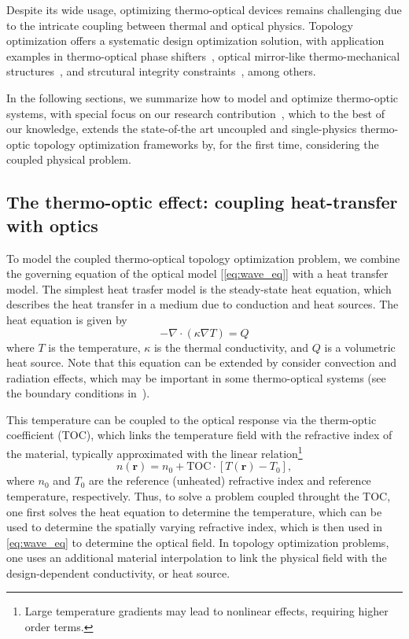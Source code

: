  Despite its wide usage, optimizing thermo-optical devices remains challenging due to the intricate coupling 
 between thermal and optical physics. Topology optimization offers a systematic design optimization solution, with application examples in
  thermo-optical phase shifters~\cite{TOPS_heat, ownpub0}, optical mirror-like thermo-mechanical structures~\cite{opt_perf}, and
strcutural integrity constraints~\cite{structural_heat}, among others.

In the following sections, we summarize how to model and optimize thermo-optic systems, 
with special focus on our research contribution~\cite{ownpub0}, which to the best of our knowledge,
extends the state-of-the art uncoupled and single-physics thermo-optic topology optimization frameworks by, for the first time, considering 
the coupled physical problem.

\subsection*{The thermo-optic effect: coupling heat-transfer with optics}

To model the coupled thermo-optical topology optimization problem, we combine the governing equation of the optical model [\eqref{eq:wave_eq}]
with a heat transfer model. The simplest heat trasfer model is the steady-state heat equation, which describes the
heat transfer in a medium due to conduction and heat sources. The heat equation is given by
\begin{equation}\label{eq:heat}
    -\nabla \cdot (\kappa \nabla T) = Q
\end{equation}
where $T$ is the temperature, $\kappa$ is the thermal conductivity, and $Q$ is a volumetric heat source. Note that this equation can be
extended by consider convection and radiation effects, which may be important in some thermo-optical systems (see the boundary conditions
in~\cite{ownpub0}).

This temperature can be coupled to the optical response via the therm-optic coefficient (TOC), which links the temperature field
with the refractive index of the material, typically approximated with the linear relation\footnote{Large temperature gradients may lead to nonlinear effects, requiring higher order terms.}
\begin{equation}
n(\mathbf{r}) = n_0 + \text{TOC} \cdot \left[T(\mathbf{r}) - T_0\right],
\end{equation}
where $n_0$ and $T_0$ are the reference (unheated) refractive index and reference temperature, respectively. Thus, to solve a problem coupled throught the TOC, one first solves the heat equation
to determine the temperature, which can be used to determine
the spatially varying refractive index, which is then used in \eqref{eq:wave_eq} to determine the optical field. In topology optimization
problems, one uses an additional material interpolation to link the physical field with the design-dependent conductivity, or heat source.

